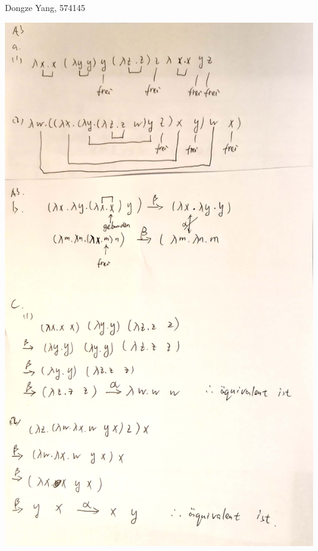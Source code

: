 \documentclass[fleqn]{article}
\begin{document}
Dongze Yang, 574145

    \includegraphics[scale=0.2]{A3.jpg}
\end{document}
